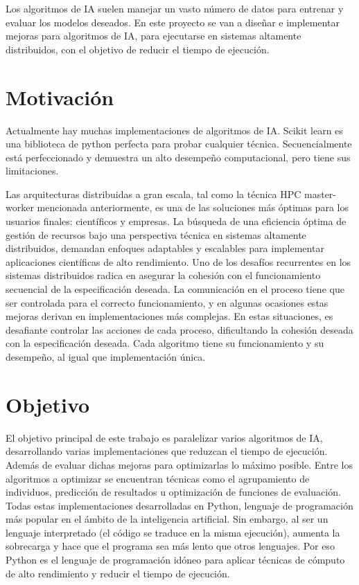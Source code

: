 Los algoritmos de IA suelen manejar un vasto número de datos para entrenar y evaluar los modelos deseados. En este proyecto se van a diseñar e implementar mejoras para algoritmos de IA, para ejecutarse en sistemas altamente distribuidos, con el objetivo de reducir el tiempo de ejecución.




\section{Motivación}
Actualmente hay muchas implementaciones de algoritmos de IA. Scikit learn es una biblioteca de python perfecta para probar cualquier técnica. Secuencialmente está perfeccionado y demuestra un alto desempeño computacional, pero tiene sus limitaciones. 

Las arquitecturas distribuidas a gran escala, tal como la técnica HPC master-worker mencionada anteriormente, es una de las soluciones más óptimas para los usuarios finales: científicos y empresas. La búsqueda de una eficiencia óptima de gestión de recursos bajo una perspectiva técnica en sistemas altamente distribuidos, demandan enfoques adaptables y escalables para implementar aplicaciones científicas de alto rendimiento. Uno de los desafíos recurrentes en los sistemas distribuidos radica en asegurar la cohesión con el funcionamiento secuencial de la especificación deseada. La comunicación en el proceso tiene que ser controlada para el correcto funcionamiento, y en algunas ocasiones estas mejoras derivan en implementaciones más complejas. 
En estas situaciones, es desafiante controlar las acciones de cada proceso, dificultando la cohesión deseada con la especificación deseada. Cada algoritmo tiene su funcionamiento y su desempeño, al igual que implementación única.






\section{Objetivo}

El objetivo principal de este trabajo es paralelizar varios algoritmos de IA, desarrollando varias implementaciones que reduzcan el tiempo de ejecución. Además de evaluar dichas mejoras para optimizarlas lo máximo posible. Entre los algoritmos a optimizar se encuentran técnicas como el agrupamiento de individuos, predicción de resultados u optimización de funciones de evaluación. Todas estas implementaciones desarrolladas en Python, lenguaje de programación más popular en el ámbito de la inteligencia artificial. Sin embargo, al ser un lenguaje interpretado (el código se traduce en la misma ejecución), aumenta la sobrecarga y hace que el programa sea más lento que otros lenguajes. Por eso Python es el lenguaje de programación idóneo para aplicar técnicas de cómputo de alto rendimiento y reducir el tiempo de ejecución.



